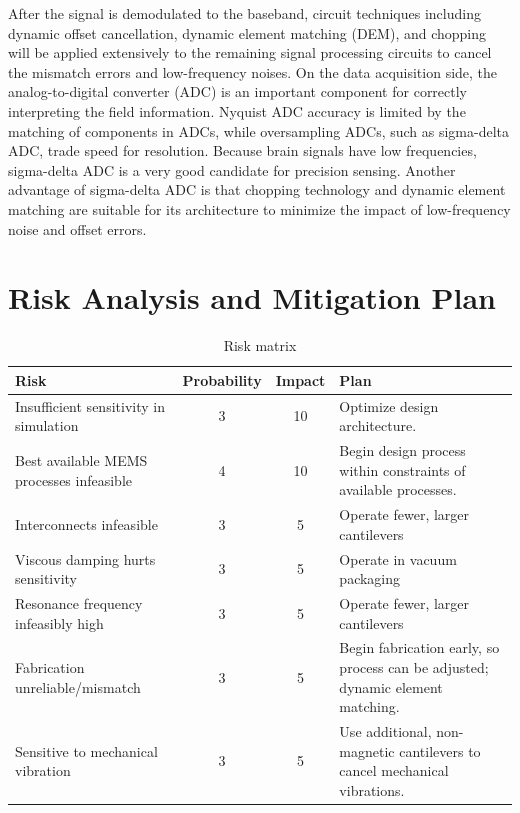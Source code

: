 After the signal is demodulated to the baseband, circuit techniques including dynamic offset cancellation, dynamic element matching (DEM), and chopping will be applied extensively to the remaining signal processing circuits to cancel the mismatch errors and low-frequency noises. On the data acquisition side, the analog-to-digital converter (ADC) is an important component for correctly interpreting the field information. Nyquist ADC accuracy is limited by the matching of components in ADCs, while oversampling ADCs, such as sigma-delta ADC, trade speed for resolution. Because brain signals have low frequencies, sigma-delta ADC is a very good candidate for precision sensing. Another advantage of sigma-delta ADC is that chopping technology and dynamic element matching are suitable for its architecture to minimize the impact of low-frequency noise and offset errors.


\section{Risk Analysis and Mitigation Plan}

\begin{table}[h!]
\centering
\begin{tabularx}{.85\textwidth}{|X||c|c|X|}
    \hline
    Risk & Probability & Impact & Plan\\
    \hline
    \hline
    Insufficient sensitivity in simulation & 3 & 10 & Optimize design architecture. \\
    \hline
    Best available MEMS processes infeasible & 4 & 10 & Begin design process within constraints of available processes. \\
    \hline
    Interconnects infeasible & 3 & 5 & Operate fewer, larger cantilevers \\
    \hline
    Viscous damping hurts sensitivity & 3 & 5 & Operate in vacuum packaging \\
    \hline
    Resonance frequency infeasibly high & 3  & 5 & Operate fewer, larger cantilevers \\
    \hline
    Fabrication unreliable/mismatch & 3 & 5 & Begin fabrication early, so process can be adjusted; dynamic element matching. \\
    \hline
    Sensitive to mechanical vibration & 3 & 5 & Use additional, non-magnetic cantilevers to cancel mechanical vibrations. \\
    \hline
\end{tabularx}
\caption{Risk matrix}
\label{table:risk}
\end{table}

